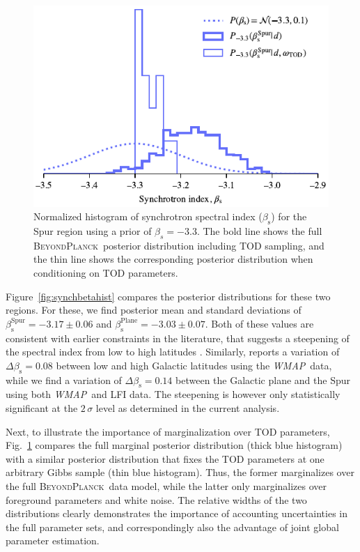 \documentclass[twocolumn]{aa}
\def\WMAP{\textit{WMAP}}
\newcommand{\BP}{\textsc{BeyondPlanck}}
\newcommand{\?}[1]{\textcolor{red}{{\bf [#1]}}}
\begin{document}
\begin{figure}[t]
  \center
  \vspace*{0.25mm}
  \includegraphics[width=\linewidth]{figs/synch-beta_pixreg_val_spur_marginalized_histogram_moresamp.pdf}
  \caption{Normalized histogram of synchrotron spectral index
    ($\beta_{\mathrm s}$) for the Spur region using a prior of
    $\beta_{s}=-3.3$. The bold line shows the full
    \BP\ posterior distribution including TOD sampling, and the thin
    line shows the corresponding posterior distribution when conditioning on TOD parameters.}
  \label{fig:synchbetaspurmarghist}
  \end{figure} 

Figure~\ref{fig:synchbetahist} compares the posterior distributions for these
two regions. For these, we find posterior mean and standard deviations of
${\beta_{\mathrm s}^{\mathrm{Spur}}=-3.17\pm0.06}$ and ${\beta_{\mathrm
s}^{\mathrm{Plane}}=-3.03\pm0.07}$. Both of these values are consistent with
earlier constraints in the literature, that suggests a steepening of the
spectral index from low to high latitudes \citep[e.g.,][]{fuskeland:2019, krachmalnicoff2018}. Similarly,
\citet{dunkley2009} reports a variation of $\Delta\beta_{\mathrm s}=0.08$
between low and high Galactic latitudes using the \WMAP\ data, while we find a
variation of $\Delta\beta_{\mathrm s}=0.14$ between the Galactic plane and the
Spur using both \WMAP\ and LFI data. The steepening is however only
statistically significant at the $2\,\sigma$ level as determined in the current analysis. 

Next, to illustrate the importance of marginalization over TOD
parameters, Fig.~\ref{fig:synchbetaspurmarghist} compares the full
marginal posterior distribution (thick blue histogram) with a similar
posterior distribution that fixes the TOD parameters at one arbitrary
Gibbs sample (thin blue histogram). Thus, the former marginalizes over
the full \BP\ data model, while the latter only marginalizes over
foreground parameters and white noise. The relative widths of the two
distributions clearly demonstrates the importance of accounting
uncertainties in the full parameter sets, and correspondingly also the
advantage of joint global parameter estimation.
\end{document}
